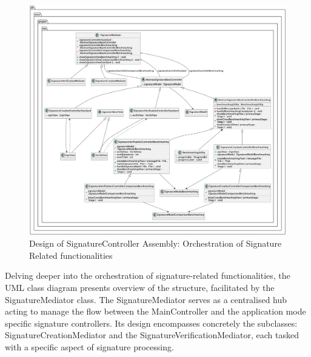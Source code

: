 \documentclass[]{final_report}
\theoremstyle{definition}
\begin{document}
\begin{figure}[H]
    \centering
    \includegraphics[width=1.2\textwidth]{main_pictures/signatureController.png}
    \caption{Design of SignatureController Assembly: Orchestration of Signature Related functionalities}
    \label{fig:SIGCONTROLLERDESIGN}
\end{figure}
Delving deeper into the orchestration of signature-related functionalities, the UML class diagram presents overview of the structure, facilitated by the SignatureMediator class.  
The SignatureMediator serves as a centralised hub acting to manage the flow between the MainController and the application mode specific signature controllers. Its design encompasses concretely the subclasses: SignatureCreationMediator and the SignatureVerificationMediator, each tasked with a specific aspect of signature processing.
\end{document}
